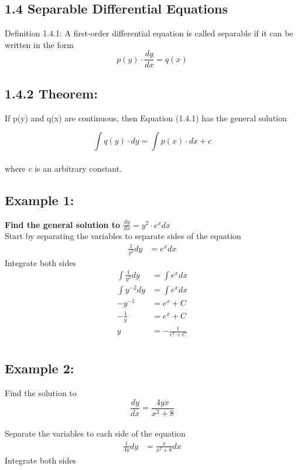 \documentclass{article}
\begin{document}
\begin{flushleft}
\section*{1.4 Separable Differential Equations  }{
Definition 1.4.1:
A first-order differential equation is called separable if it can be written in the form
\[p(y)\cdot \frac{dy}{dx} = q(x) \] 


\subsection*{\textbf{1.4.2 Theorem:}} 
If p(y) and q(x) are continuous, then Equation (1.4.1) has the general solution

\[\int q(y) \cdot dy  = \int p(x) \cdot dx + c\]\\


where $c$ is an arbitrary constant.\\
\subsection*{\textbf{Example 1:}} 
\textbf{Find the general solution to $\frac{dy}{dx} = y^2 \cdot e^x dx$}\\

Start by separating the variables to separate sides of the equation\\
\begin{align*}
\frac{1}{y^2} dy & = e^x dx
\end{align*}
Integrate both sides
\begin{align*}
\int \frac{1}{y^2} dy & = \int e^x dx \\
\int y^{-2} dy & = \int e^x dx \\
-y^{-1} & = e^x + C \\
-\frac{1}{y} & = e^x +C \\
y & = - \frac{1}{e^x + C} \\
\end{align*}

\subsection*{\textbf{Example 2:}} 
Find the solution to \[\frac{dy}{dx}=\frac{4yx}{x^2+8}\] \\ 
Separate the variables to each side of the equation \\

\begin{align*}
\frac{1}{4y} dy & = \frac{x}{x^2 + 8} dx
\end{align*}
Integrate both sides

}
\end{flushleft}
\end{document}
